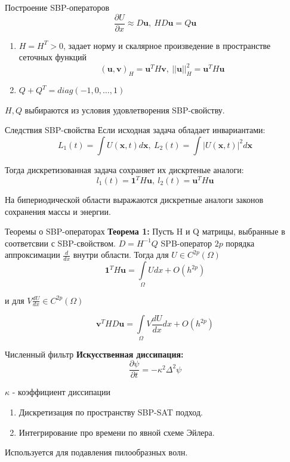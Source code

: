 \documentclass[10pt]{beamer}
\begin{document}
\begin{frame}{Построение SBP-операторов}
$$\frac{\partial U}{\partial x} \approx D \textbf{u}, \ HD\textbf{u} = Q\textbf{u}$$
\begin{enumerate}
\item $H=H^T>0$, задает норму и скалярное произведение в пространстве сеточных функций  $$(\textbf{u},\textbf{v})_H=\textbf{u}^TH\textbf{v}, \ ||\textbf{u}||^2_H=\textbf{u}^TH\textbf{u}$$
\item $Q+Q^T=diag(-1,0,\ldots , 1)$
\end{enumerate}

$H,Q$ выбираются из условия удовлетворения SBP-свойству.
\end{frame}

\begin{frame}{Следствия SBP-свойства}
Если исходная задача обладает инвариантами:
$$L_1(t)=\int{U(\textbf{x},t)}d\textbf{x}, \ L_2(t)=\int{|U(\textbf{x},t)|^2}d\textbf{x}$$

Тогда дискретизованная задача сохраняет их дискртеные аналоги:
$$l_1(t) = \textbf{1}^TH\textbf{u}, \ l_2(t)=\textbf{u}^TH\textbf{u}$$

На бипериодической области выражаются дискретные аналоги законов сохранения массы и энергии.
\end{frame}

\begin{frame}{Теоремы о SBP-операторах}
\textbf{Теорема 1:} Пусть H и Q матрицы, выбранные в соответсвии с SBP-свойством. $D = H^{-1}Q$ SPB-оператор $2p$ порядка аппроксимации $\frac{d}{dx}$ внутри области. Тогда для $U\in C^{2p}(\Omega)$
$$\textbf{1}^T H \textbf{u} = \int\limits_{\Omega} {Udx} + O(h^{2p})$$

и для $V\frac{dU}{dx}\in C^{2p}(\Omega)$

$$\textbf{v}^T H D\textbf{u} = \int\limits_{\Omega}{V \frac{dU}{dx}dx} + O(h^{2p})$$
\end{frame}


\begin{frame}{Численный фильтр}
\textbf{Искусственная диссипация:}
$$\frac{\partial\psi}{\partial t}=-\kappa^2\Delta^2\psi$$

$\kappa$ - коэффициент диссипации

\begin{enumerate}
\item Дискретизация по пространству SBP-SAT подход.
\item Интегрирование про времени по явной схеме Эйлера.
\end{enumerate}

Используется для подавления пилообразных волн.
\end{frame}
\end{document}
